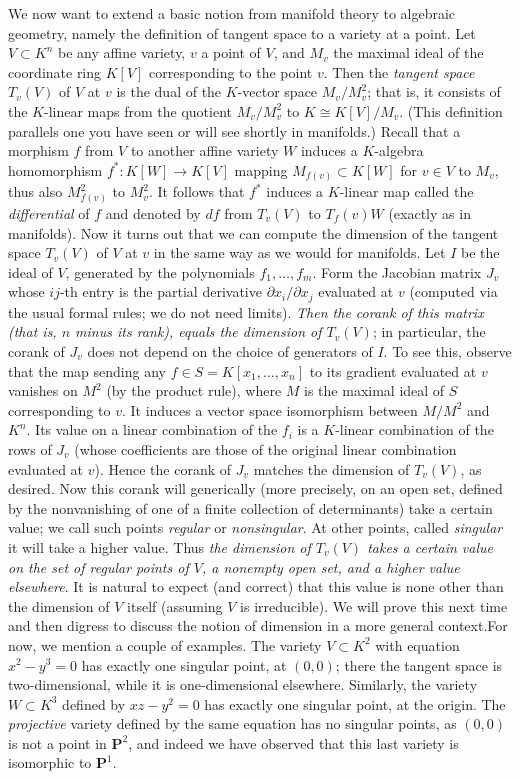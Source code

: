 \documentclass[10pt]{article}
\begin{document}
We now want to extend a basic notion from manifold theory to algebraic
geometry, namely the definition of tangent space to a variety at a
point. Let $V\subset K^n$ be any affine variety, $v$ a point of $V$, and
$M_v$ the maximal ideal of the coordinate ring $K[V]$ corresponding to
the point $v$. Then the {\sl tangent space} $T_v(V)$ of $V$ at $v$ is
the dual of the $K$-vector space $M_v/M_v^2$; that is, it consists of
the $K$-linear maps from the quotient $M_v/M_v^2$ to $K\cong K[V]/M_v$.
(This definition parallels one you have seen or will see shortly in
manifolds.) Recall that a morphism $f$ from $V$ to another affine
variety $W$ induces a $K$-algebra homomorphism $f^*:K[W]\rightarrow
K[V]$ mapping $M_{f(v)}\subset K[W]$ for $v\in V$ to $M_v$, thus also
$M_{f(v)}^2$ to $M_v^2$. It follows that $f^*$ induces a $K$-linear map
called the {\sl differential} of $f$ and denoted by $df$ from $T_v(V)$
to $T_f(v) W$ (exactly as in manifolds). Now it turns out that we can
compute the dimension of the tangent space $T_v(V)$ of $V$ at $v$ in the
same way as we would for manifolds. Let $I$ be the ideal of $V$,
generated by the polynomials $f_1,\ldots,f_m$. Form the Jacobian matrix
$J_v$ whose $ij$-th entry is the partial derivative $\partial
x_i/\partial x_j$ evaluated at $v$ (computed via the usual formal rules;
we do not need limits). {\sl Then the corank of this matrix (that is,
  $n$ minus its rank), equals the dimension of $T_v(V)$}; in particular,
the corank of $J_v$ does not depend on the choice of generators of $I$.
To see this, observe that the map sending any $f\in S=K[x_1,\ldots,x_n]$
to its gradient evaluated at $v$ vanishes on $M^2$ (by the product
rule), where $M$ is the maximal ideal of $S$ corresponding to $v$. It
induces a vector space isomorphism between $M/M^2$ and $K^n$. Its value
on a linear combination of the $f_i$ is a $K$-linear combination of the
rows of $J_v$ (whose coefficients are those of the original linear
combination evaluated at $v$). Hence the corank of $J_v$ matches the
dimension of $T_v(V)$, as desired. Now this corank will generically
(more precisely, on an open set, defined by the nonvanishing of one of a
finite collection of determinants) take a certain value; we call such
points {\sl regular} or {\sl nonsingular}. At other points, called {\sl
  singular} it will take a higher value. Thus {\sl the dimension of
  $T_v(V)$ takes a certain value on the set of regular points of $V$, a
  nonempty open set, and a higher value elsewhere}. It is natural to
expect (and correct) that this value is none other than the dimension of
$V$ itself (assuming $V$ is irreducible). We will prove this next time
and then digress to discuss the notion of dimension in a more general
context.For now, we mention a couple of examples. The variety $V\subset
K^2$ with equation $x^2 - y^3 = 0$ has exactly one singular point, at
$(0,0)$; there the tangent space is two-dimensional, while it is
one-dimensional elsewhere. Similarly, the variety $W\subset K^3$ defined
by $xz - y^2 = 0$ has exactly one singular point, at the origin. The
{\sl projective} variety defined by the same equation has no singular
points, as $(0,0)$ is not a point in $\mathbf P^2$, and indeed we have
observed that this last variety is isomorphic to $\mathbf P^1$.
\end{document}
